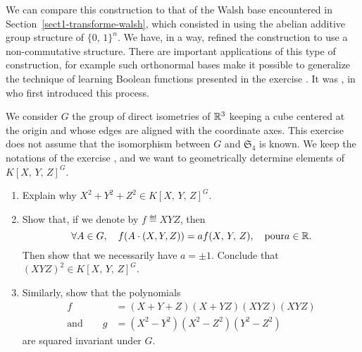\begin{exo}
\begin{enumerate}
\end{enumerate} We can compare this construction to that of the Walsh base encountered in Section~\ref{sect1-transforme-walsh}, which consisted in using the abelian additive group structure of $ \{0, \, 1\}^n $. We have, in a way, refined the construction to use a non-commutative structure. There are important applications of this type of construction, for example such orthonormal bases make it possible to generalize the technique of learning Boolean functions presented in the exercise . It was , in~{\upshape \cite{boneh-learning-boolean}} who first introduced this process.
\end{exo}
 
 
\begin{exo}
\label{exo-ring-invariants}
 
  We consider $ G $ the group of direct isometries of $ \mathbb{R}^3 $ keeping a cube centered at the origin and whose edges are aligned with the coordinate axes. This exercise does not assume that the isomorphism between $ G $ and $ \mathfrak{S}_4 $ is known. We keep the notations of the exercise , and we want to geometrically determine elements of $ K [X, \, Y, \, Z]^G $. \begin{enumerate}
\item Explain why $ X^2 + Y^2 + Z^2 \in K [X, \, Y, \, Z]^G $.
\item Show that, if we denote by $ f \eqdef XYZ $, then
\begin{equation*}
\forall A \in G, \quad f(A \cdot (X, Y, Z)) = af(X, \, Y, \, Z), \quad \text{pour} a \in \mathbb{R}.
\end{equation*}
Then show that we necessarily have $ a = \pm 1 $. Conclude that $ (XYZ)^2 \in K [X, \, Y, \, Z]^G $.
\item Similarly, show that the polynomials
\begin{align*}
f & = (X + Y + Z) (X + YZ) (XYZ) (XYZ) \\
\text{and} \quad \quad g & = (X^2-Y^2) (X^2-Z^2) (Y^2-Z^2)
\end{align*}
are squared invariant under $ G $.
\end{enumerate}
\end{exo}
 
